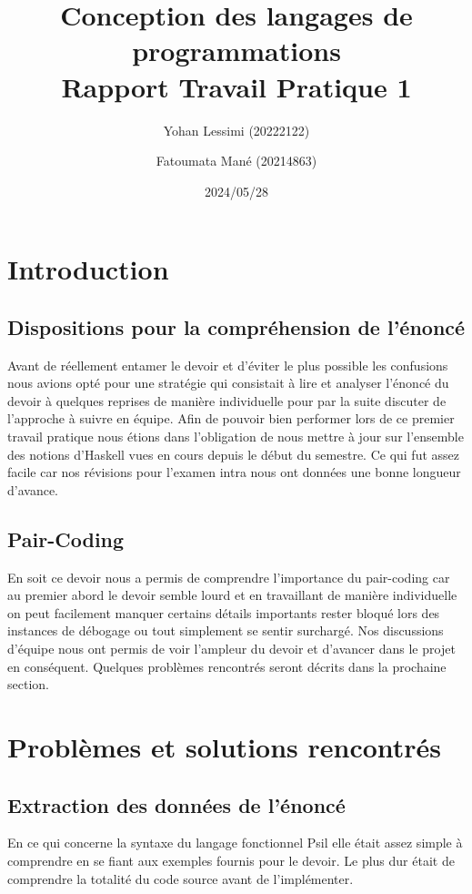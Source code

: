 \documentclass[a4paper,12pt]{article}
\title{Conception des langages de programmations \\ \large Rapport Travail Pratique 1}
\author{Yohan Lessimi (20222122) \and Fatoumata Mané (20214863)}
\date{2024/05/28}
\begin{document}
\maketitle

\section*{Introduction}
\subsection*{Dispositions pour la compréhension de l’énoncé}
Avant de réellement entamer le devoir et d’éviter le plus possible les confusions nous avions opté pour une stratégie qui consistait à lire et analyser l’énoncé du devoir à quelques reprises de manière individuelle pour par la suite discuter de l’approche à suivre en équipe. Afin de pouvoir bien performer lors de ce premier travail pratique nous étions dans l’obligation de nous mettre à jour sur l’ensemble des notions d’Haskell vues en cours depuis le début du semestre. Ce qui fut assez facile car nos révisions pour l’examen intra nous ont données une bonne longueur d’avance.

\subsection*{Pair-Coding}
En soit ce devoir nous a permis de comprendre l’importance du pair-coding car au premier abord le devoir semble lourd et en travaillant de manière individuelle on peut facilement manquer certains détails importants rester bloqué lors des instances de débogage ou tout simplement se sentir surchargé. Nos discussions d’équipe nous ont permis de voir l’ampleur du devoir et d’avancer dans le projet en conséquent. Quelques problèmes rencontrés seront décrits dans la prochaine section.

\section*{Problèmes et solutions rencontrés}
\subsection*{Extraction des données de l’énoncé}
En ce qui concerne la syntaxe du langage fonctionnel Psil elle était assez simple à comprendre en se fiant aux exemples fournis pour le devoir. Le plus dur était de comprendre la totalité du code source avant de l’implémenter.
\end{document}
